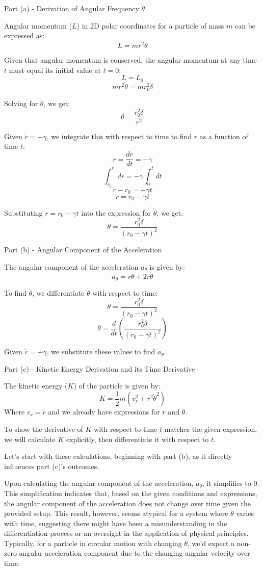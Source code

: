 Part (a) - Derivation of Angular Frequency \( \dot{\theta} \)

Angular momentum (\( L \)) in 2D polar coordinates for a particle of mass \( m \) can be expressed as:
\[ L = m r^2 \dot{\theta} \]

Given that angular momentum is conserved, the angular momentum at any time \( t \) must equal its initial value at \( t = 0 \):
\[ L = L_0 \]
\[ m r^2 \dot{\theta} = m r_0^2 \delta \]

Solving for \( \dot{\theta} \), we get:
\[ \dot{\theta} = \frac{r_0^2 \delta}{r^2} \]

Given \( \dot{r} = - \gamma \), we integrate this with respect to time to find \( r \) as a function of time \( t \):
\[ \dot{r} = \frac{dr}{dt} = - \gamma \]
\[ \int_{r_0}^{r} dr = - \gamma \int_{0}^{t} dt \]
\[ r - r_0 = - \gamma t \]
\[ r = r_0 - \gamma t \]

Substituting \( r = r_0 - \gamma t \) into the expression for \( \dot{\theta} \), we get:
\[ \dot{\theta} = \frac{r_0^2 \delta}{(r_0 - \gamma t)^2} \]

Part (b) - Angular Component of the Acceleration

The angular component of the acceleration \( a_{\theta} \) is given by:
\[ a_{\theta} = r \ddot{\theta} + 2\dot{r}\dot{\theta} \]

To find \( \ddot{\theta} \), we differentiate \( \dot{\theta} \) with respect to time:
\[ \dot{\theta} = \frac{r_0^2 \delta}{(r_0 - \gamma t)^2} \]
\[ \ddot{\theta} = \frac{d}{dt}\left(\frac{r_0^2 \delta}{(r_0 - \gamma t)^2}\right) \]

Given \( \dot{r} = - \gamma \), we substitute these values to find \( a_{\theta} \).

Part (c) - Kinetic Energy Derivation and its Time Derivative

The kinetic energy (\( K \)) of the particle is given by:
\[ K = \frac{1}{2} m (v_r^2 + r^2 \dot{\theta}^2) \]
Where \( v_r = \dot{r} \) and we already have expressions for \( \dot{r} \) and \( \dot{\theta} \).

To show the derivative of \( K \) with respect to time \( t \) matches the given expression, we will calculate \( K \) explicitly, then differentiate it with respect to \( t \).

Let's start with these calculations, beginning with part (b), as it directly influences part (c)'s outcomes.

Upon calculating the angular component of the acceleration, \( a_{\theta} \), it simplifies to \( 0 \). This simplification indicates that, based on the given conditions and expressions, the angular component of the acceleration does not change over time given the provided setup. This result, however, seems atypical for a system where \( \dot{\theta} \) varies with time, suggesting there might have been a misunderstanding in the differentiation process or an oversight in the application of physical principles. Typically, for a particle in circular motion with changing \( \dot{\theta} \), we'd expect a non-zero angular acceleration component due to the changing angular velocity over time. 

